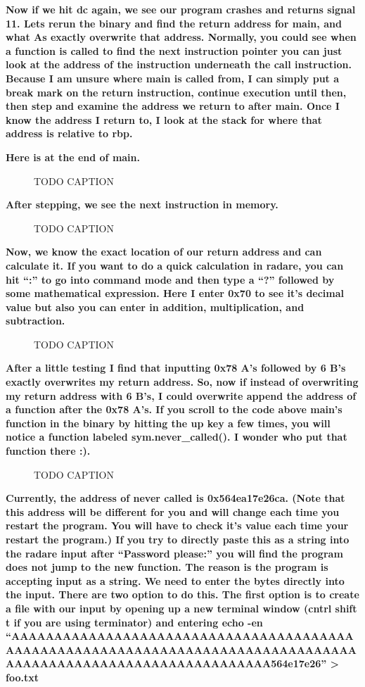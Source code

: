 \documentclass[letterpaper]{article}
\newcommand{\sitfig}[3]{
\begin{figure}[H]
\centering
\makebox[\textwidth][c]{
#2
}
\caption{#3}
\label{#1}
\end{figure}
}
\newcommand{\sitgfx}[4][scale=1.0]{
\sitfig{#3}{\texttt{[image: \#2]}}{#4}
}
\begin{document}
\textbf{Now if we hit dc again, we see our program crashes and returns signal 11. Lets rerun the binary and find the
return address for main, and what As exactly overwrite that address. Normally, you could see when a function is called
to find the next instruction pointer you can just look at the address of the instruction underneath the call
instruction. Because I am unsure where main is called from, I can simply put a break mark on the return instruction,
continue execution until then, then step and examine the address we return to after main. Once I know the address I
return to, I look at the stack for where that address is relative to rbp.}

\textbf{Here is at the end of main.}\newline
  
\sitgfx[width=5.8335in,height=3.6457in]{FINALWORKINGDOCFORMERLYPRECURSOR-img094.png}{fig:unk}{TODO CAPTION}
 

\textbf{After stepping, we see the next instruction in memory.\newline
}  
\sitgfx[width=5.8335in,height=3.6457in]{FINALWORKINGDOCFORMERLYPRECURSOR-img095.png}{fig:unk}{TODO CAPTION}
 

\textbf{Now, we know the exact location of our return address and can calculate it. If you want to do a quick
calculation in radare, you can hit ``:'' to go into command mode and then type a ``?'' followed by some mathematical
expression. Here I enter 0x70 to see it's decimal value but also you can enter in addition, multiplication, and
subtraction.}

  
\sitgfx[width=5.8335in,height=3.6457in]{FINALWORKINGDOCFORMERLYPRECURSOR-img089.png}{fig:unk}{TODO CAPTION}
 

\textbf{After a little testing I find that inputting 0x78 A's followed by 6 B's exactly overwrites my return address.
So, now if instead of overwriting my return address with 6 B's, I could overwrite append the address of a function
after the 0x78 A's. If you scroll to the code above main's function in the binary by hitting the up key a few times,
you will notice a function labeled sym.never\_called(). I wonder who put that function there :).}

  
\sitgfx[width=5.8335in,height=3.6457in]{FINALWORKINGDOCFORMERLYPRECURSOR-img096.png}{fig:unk}{TODO CAPTION}
 

\textbf{Currently, the address of never called is 0x564ea17e26ca. (Note that this address will be different for you and
will change each time you restart the program. You will have to check it's value each time your restart the program.)
If you try to directly paste this as a string into the radare input after ``Password please:'' you will find the
program does not jump to the new function. The reason is the program is accepting input as a string. We need to enter
the bytes directly into the input. There are two option to do this. The first option is to create a file with our input
by opening up a new terminal window (cntrl shift t if you are using terminator) and entering echo -en
``AAAAAAAAAAAAAAAAAAAAAAAAAAAAAAAAAAAAAAAAAAAAAAAAAAAAAAAAAAAAAAAAAAAAAAAAAAAAAAAAAAAAAAAAAAAAAAAAAAAAAAAAAAAAAAAA564e17e26''
{\textgreater} foo.txt}
\end{document}
